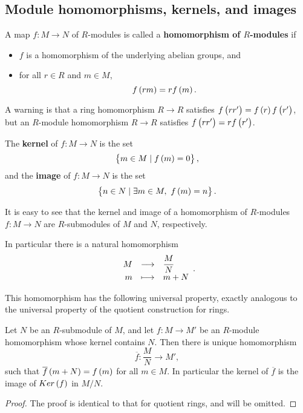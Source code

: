 \subsection{Module homomorphisms, kernels, and images}

\begin{definition}
A map $ f : M \to N $ of $ R $-modules is called a \textbf{homomorphism of $ R $-modules} if
\begin{itemize}
\item $ f $ is a homomorphism of the underlying abelian groups, and
\item for all $ r \in R $ and $ m \in M $,
$$ f\br{rm} = rf\br{m}. $$
\end{itemize}
\end{definition}

A warning is that a ring homomorphism $ R \to R $ satisfies $ f\br{rr'} = f\br{r}f\br{r'} $, but an $ R $-module homomorphism $ R \to R $ satisfies $ f\br{rr'} = rf\br{r'} $.

\begin{definition}
The \textbf{kernel} of $ f : M \to N $ is the set
$$ \cbr{m \in M \mid f\br{m} = 0}, $$
and the \textbf{image} of $ f : M \to N $ is the set
$$ \cbr{n \in N \mid \exists m \in M, \ f\br{m} = n}. $$
\end{definition}

It is easy to see that the kernel and image of a homomorphism of $ R $-modules $ f : M \to N $ are $ R $-submodules of $ M $ and $ N $, respectively.

\begin{note*}
In particular there is a natural homomorphism
$$ \function{M}{\dfrac{M}{N}}{m}{m + N}. $$
\end{note*}

This homomorphism has the following universal property, exactly analogous to the universal property of the quotient construction for rings.

\begin{proposition}
Let $ N $ be an $ R $-submodule of $ M $, and let $ f : M \to M' $ be an $ R $-module homomorphism whose kernel contains $ N $. Then there is unique homomorphism
$$ \overline{f} : \dfrac{M}{N} \to M', $$
such that $ \overline{f}\br{m + N} = f\br{m} $ for all $ m \in M $. In particular the kernel of $ \overline{f} $ is the image of $ Ker\br{f} $ in $ M / N $.
\end{proposition}

\begin{proof}
The proof is identical to that for quotient rings, and will be omitted.
\end{proof}

